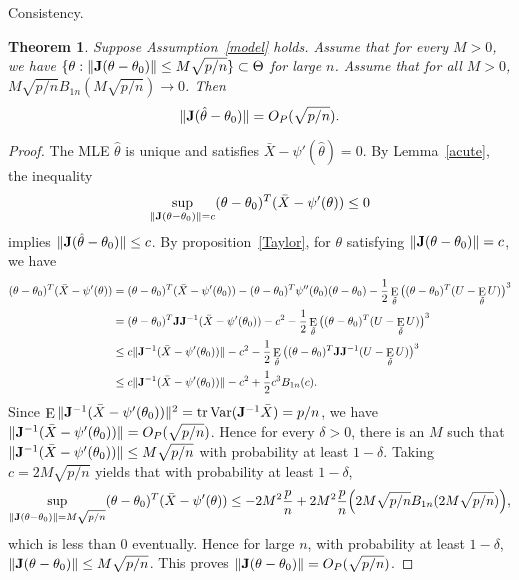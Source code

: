 \documentclass[11pt, letterpaper]{article}
\DeclareMathOperator{\mytr}{tr}
\DeclareMathOperator{\myE}{E}
\DeclareMathOperator{\myVar}{Var}
\theoremstyle{plain}
\newtheorem{theorem}{\quad\quad Theorem}
\theoremstyle{definition}
\theoremstyle{remark}
\begin{document}
Consistency.
\begin{theorem}\label{TheoremConsistency}
    Suppose Assumption~\ref{model} holds.
    Assume that for every $M>0$, we have $\{\theta:\|\mathbf{J}(\theta-\theta_0)\|\leq M\sqrt{p/n} \}\subset \Theta$ for large $n$.
    Assume that for all $M>0$, $M\sqrt{p/n}B_{1n}(M\sqrt{p/n})\to 0$.
    Then
    $$\|\mathbf{J}(\hat{\theta}-\theta_0)\|=O_P(\sqrt{p/n}).$$
\end{theorem}
\begin{proof}
    The MLE $\hat{\theta}$ is unique and satisfies $\bar{X}-\psi'(\hat{\theta})=0$.
    By Lemma~\ref{acute}, the inequality 
    $$\sup_{\|\mathbf{J}(\theta-\theta_0)\|=c}(\theta-\theta_0)^T(\bar{X}-\psi'(\theta))\leq 0$$
    implies $\|\mathbf{J}(\hat{\theta}-\theta_0)\|\leq c$.
    By proposition~\ref{Taylor}, for $\theta$ satisfying $\|\mathbf{J}(\theta-\theta_0)\|=c$, we have
    $$
    \begin{aligned}
        (\theta-\theta_0)^T(\bar{X}-\psi'(\theta))&=
    (\theta-\theta_0)^T(\bar{X}-\psi' (\theta_0))
    -(\theta-\theta_0)^T \psi''(\theta_0)(\theta-\theta_0)
        -\frac{1}{2}\myE_{\tilde\theta}\big((\theta-\theta_0)^T (U-\myE_{\tilde\theta}U)\big)^3\\
        &=
        (\theta-\theta_0)^T \BJ \BJ^{-1}(\bar{X}-\psi' (\theta_0))
        -c^2
        -\frac{1}{2}\myE_{\tilde\theta}\big((\theta-\theta_0)^T (U-\myE_{\tilde\theta}U)\big)^3\\
        &\leq
        c \|\BJ^{-1}(\bar{X}-\psi' (\theta_0))\|
        -c^2
        -\frac{1}{2}\myE_{\tilde\theta}\big((\theta-\theta_0)^T \BJ \BJ^{-1} (U-\myE_{\tilde\theta}U)\big)^3\\
        &\leq
        c \|\BJ^{-1}(\bar{X}-\psi' (\theta_0))\|
        -c^2
        +\frac{1}{2} c^3 B_{1n}(c).
    \end{aligned}
    $$
    Since $\myE\|\BJ^{-1}(\bar{X}-\psi' (\theta_0))\|^2=\mytr \myVar (\BJ^{-1}\bar{X})=p/n$, we have $\|\mathbf{J}^{-1}(\bar{X}-\psi' (\theta_0))\|=O_P(\sqrt{p/n})$.
    Hence for every $\delta>0$, there is an $M$ such that $\|\mathbf{J}^{-1}(\bar{X}-\psi' (\theta_0))\|\leq M\sqrt{p/n}$ with probability at least $1-\delta$.
    Taking $c=2M\sqrt{p/n}$ yields that with probability at least $1-\delta$,
    $$
        \sup_{\|\mathbf{J}(\theta-\theta_0)\|=M\sqrt{p/n}}(\theta-\theta_0)^T(\bar{X}-\psi'(\theta))\leq -2 M^2 \frac{p}{n}+ 2 M^2 \frac{p}{n} \Big(2M\sqrt{p/n}B_{1n}(2M\sqrt{p/n})\Big),
    $$
    which is less than $0$ eventually.
    Hence for large $n$, with probability at least $1-\delta$, $\|\mathbf{J}(\theta-\theta_0)\|\leq M\sqrt{p/n}$.
    This proves $\|\mathbf{J}(\theta-\theta_0)\|=O_P(\sqrt{p/n})$.

\end{proof}
\end{document}

